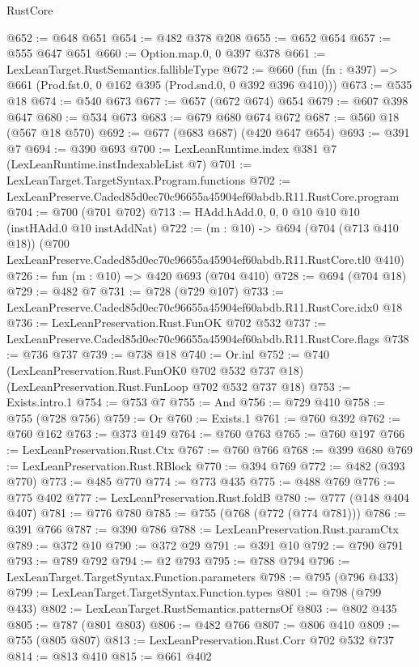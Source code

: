 \begin{lexlean}{RustCore}
\begin{coremodule}
@652 := @648 @651
@654 := @482 @378 @208
@655 := @652 @654
@657 := @555 @647 @651
@660 := Option.map.{0, 0} @397 @378
@661 := LexLeanTarget.RustSemantics.fallibleType
@672 := @660 (fun (fn : @397) => @661 (Prod.fst.{0, 0} @162 @395 (Prod.snd.{0, 0} @392 @396 @410)))
@673 := @535 @18
@674 := @540 @673
@677 := @657 (@672 @674) @654
@679 := @607 @398 @647
@680 := @534 @673
@683 := @679 @680 @674 @672
@687 := @560 @18 (@567 @18 @570)
@692 := @677 (@683 @687) (@420 @647 @654)
@693 := @391 @7
@694 := @390 @693
@700 := LexLeanRuntime.index @381 @7 (LexLeanRuntime.instIndexableList @7)
@701 := LexLeanTarget.TargetSyntax.Program.functions
@702 := LexLeanPreserve.Caded85d0ec70c96655a45904ef60abdb.R11.RustCore.program
@704 := @700 (@701 @702)
@713 := HAdd.hAdd.{0, 0, 0} @10 @10 @10 (instHAdd.{0} @10 instAddNat)
@722 := (m : @10) ->
  @694
    (@704 (@713 @410 @18))
    (@700 LexLeanPreserve.Caded85d0ec70c96655a45904ef60abdb.R11.RustCore.tl0 @410)
@726 := fun (m : @10) => @420 @693 (@704 @410)
@728 := @694 (@704 @18)
@729 := @482 @7
@731 := @728 (@729 @107)
@733 := LexLeanPreserve.Caded85d0ec70c96655a45904ef60abdb.R11.RustCore.idx0 @18
@736 := LexLeanPreservation.Rust.FunOK @702 @532
@737 := LexLeanPreserve.Caded85d0ec70c96655a45904ef60abdb.R11.RustCore.flags
@738 := @736 @737
@739 := @738 @18
@740 := Or.inl
@752 := @740
    (LexLeanPreservation.Rust.FunOK0 @702 @532 @737 @18)
    (LexLeanPreservation.Rust.FunLoop @702 @532 @737 @18)
@753 := Exists.intro.{1}
@754 := @753 @7
@755 := And
@756 := @729 @410
@758 := @755 (@728 @756)
@759 := Or
@760 := Exists.{1}
@761 := @760 @392
@762 := @760 @162
@763 := @373 @149
@764 := @760 @763
@765 := @760 @197
@766 := LexLeanPreservation.Rust.Ctx
@767 := @760 @766
@768 := @399 @680
@769 := LexLeanPreservation.Rust.RBlock
@770 := @394 @769
@772 := @482 (@393 @770)
@773 := @485 @770
@774 := @773 @435
@775 := @488 @769
@776 := @775 @402
@777 := LexLeanPreservation.Rust.foldB
@780 := @777 (@148 @404 @407)
@781 := @776 @780
@785 := @755 (@768 (@772 (@774 @781)))
@786 := @391 @766
@787 := @390 @786
@788 := LexLeanPreservation.Rust.paramCtx
@789 := @372 @10
@790 := @372 @29
@791 := @391 @10
@792 := @790 @791
@793 := @789 @792
@794 := @2 @793
@795 := @788 @794
@796 := LexLeanTarget.TargetSyntax.Function.parameters
@798 := @795 (@796 @433)
@799 := LexLeanTarget.TargetSyntax.Function.types
@801 := @798 (@799 @433)
@802 := LexLeanTarget.RustSemantics.patternsOf
@803 := @802 @435
@805 := @787 (@801 @803)
@806 := @482 @766
@807 := @806 @410
@809 := @755 (@805 @807)
@813 := LexLeanPreservation.Rust.Corr @702 @532 @737
@814 := @813 @410
@815 := @661 @402

\end{coremodule}
\end{lexlean}
